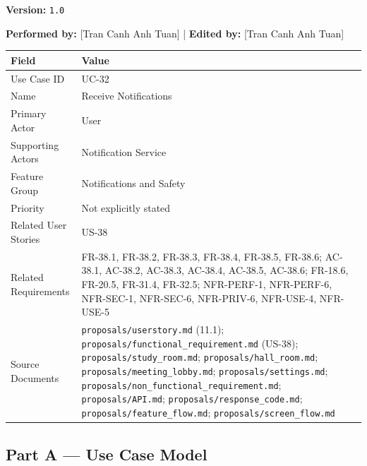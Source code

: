 \documentclass[12pt]{article}
\renewcommand{\baselinestretch}{1.5}
\begin{document}
\textbf{Version:} \texttt{1.0}
\par\medskip

\textbf{Performed by:} [Tran Canh Anh Tuan] | \textbf{Edited by:} [Tran Canh Anh Tuan]
\par\medskip

\begingroup
\small
\renewcommand{\baselinestretch}{1.0}\selectfont
\renewcommand{\arraystretch}{1.15}
\setlength{\tabcolsep}{6pt}
\begin{longtable}{|>{\raggedright\arraybackslash}p{}|>{\raggedright\arraybackslash}p{}|}
\hline
\textbf{Field} & \textbf{Value} \\ \hline
\endhead
Use Case ID & UC-32 \\ \hline
Name & Receive Notifications \\ \hline
Primary Actor & User \\ \hline
Supporting Actors & Notification Service \\ \hline
Feature Group & Notifications and Safety \\ \hline
Priority & Not explicitly stated \\ \hline
Related User Stories & US-38 \\ \hline
Related Requirements & FR-38.1, FR-38.2, FR-38.3, FR-38.4, FR-38.5, FR-38.6; AC-38.1, AC-38.2, AC-38.3, AC-38.4, AC-38.5, AC-38.6; FR-18.6, FR-20.5, FR-31.4, FR-32.5; NFR-PERF-1, NFR-PERF-6, NFR-SEC-1, NFR-SEC-6, NFR-PRIV-6, NFR-USE-4, NFR-USE-5 \\ \hline
Source Documents & \texttt{proposals/userstory.md} (11.1); \texttt{proposals/functional\_requirement.md} (US-38); \texttt{proposals/study\_room.md}; \texttt{proposals/hall\_room.md}; \texttt{proposals/meeting\_lobby.md}; \texttt{proposals/settings.md}; \texttt{proposals/non\_functional\_requirement.md}; \texttt{proposals/API.md}; \texttt{proposals/response\_code.md}; \texttt{proposals/feature\_flow.md}; \texttt{proposals/screen\_flow.md} \\ \hline
\end{longtable}
\endgroup
\par\medskip

\hypertarget{sec:part-a-use-case-model}{}
\subsection*{Part A --- Use Case Model}
\par\medskip
\end{document}

